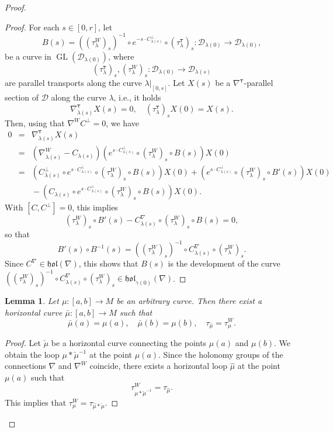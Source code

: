 \documentclass{amsart}
\theoremstyle{plain}
\newtheorem{lem}[theorem]{Lemma}
\theoremstyle{definition}
\newcommand{\GL}{\operatorname{GL}}
\newcommand{\hol}{\mathfrak{hol}}
\newcommand{\bt}{{\boldsymbol{\tau}}}
\newcommand{\1}{\mathbf{1}}
\newcommand{\D}{{\mathcal D}}
\newcommand{\+}{\oplus}
\begin{document}
\begin{proof}
\begin{proof}  For each $s\in [0,r]$, let 
$$B(s)=((\tau_\lambda^W)_s)^{-1}\circ e^{-s\cdot C^\bot_{\lambda(s)}}\circ (\tau_\lambda^\bt)_s:\D_{\lambda(0)}\to \D_{\lambda(0)},$$
be a curve in $\GL(\D_{\lambda(0)})$,
where $$(\tau_\lambda^\bt)_s,(\tau_\lambda^W)_s:\D_{\lambda(0)}\to\D_{\lambda(s)}$$ are parallel transports along the curve $\lambda|_{[0,s]}$.
Let $X(s)$ be a $\nabla^\bt$-parallel section of $\D$ along the curve $\lambda$, i.e., it holds
$$\nabla^\bt_{\dot\lambda(s)}X(s)=0,\quad (\tau_\lambda^\bt)_s X(0)=X(s). $$
Then, using that   $\nabla^W C^\perp=0$, we have 
\begin{eqnarray*}
0&=&\nabla_{\dot\lambda(s)}^\bt X(s)
\\
&=&\left(\nabla^W_{\dot\lambda(s)}-C_{\lambda(s)} \right) \left( e^{s\cdot C^\bot_{\lambda(s)}}\circ (\tau_\lambda^W)_s\circ B(s)\right) X(0)
\\
&=& \left(C^\bot_{\lambda(s)}\circ e^{s\cdot C^\bot_{\lambda(s)}}\circ (\tau_\lambda^W)_s\circ B(s)\right) X(0)+\left( e^{s\cdot C^\bot_{\lambda(s)}}\circ (\tau_\lambda^W)_s\circ B'(s)\right) X(0)
\\
&&{}-\left(C_{\lambda(s)}\circ e^{s\cdot C^\bot_{\lambda(s)}}\circ (\tau_\lambda^W)_s\circ B(s)\right) X(0).
\end{eqnarray*}
With  $[C,C^\perp]=0$, this implies 
$$(\tau_\lambda^W)_s\circ B'(s)-C^\nabla_{\lambda(s)}\circ (\tau_\lambda^W)_s\circ B(s)=0,$$
so that
$$ B'(s)\circ B^{-1}(s)=((\tau_\lambda^W)_s)^{-1}\circ C^\nabla_{\lambda(s)}\circ (\tau_\lambda^W)_s.$$ 
Since $C^\nabla\in \hol(\nabla)$, this  shows that $B(s)$ is the development of the curve 
$((\tau_\lambda^W)_s)^{-1}\circ C^\nabla_{\lambda(s)}\circ (\tau_\lambda^W)_s\in\hol_{\gamma(0)}(\nabla)$. \end{proof}

\begin{lem}\label{lemxi2} Let $\mu:[a,b]\to M$ be an arbitrary curve. Then there exist a horizontal curve $\bar\mu:[a,b]\to M$ such that
	$$\bar\mu(a)=\mu(a),\quad \bar\mu(b)=\mu(b),\quad \tau_{\bar\mu}=\tau^W_\mu.$$ 
\end{lem}

\begin{proof}  Let $\check\mu$ be a horizontal curve connecting the points $\mu(a)$ and $\mu(b)$. We obtain the loop $\mu*\check\mu^{-1}$ at the point $\mu(a)$.
Since the holonomy groups of the connections $\nabla$ and $\nabla^W$ coincide, there exists a horizontal loop $\hat\mu$ at the point $\mu(a)$ such that
$$\tau^W_{\mu*\check\mu^{-1}}=\tau_{\hat\mu}.$$ This implies that 
$\tau^W_{\mu}=\tau_{\hat\mu*\check\mu}$.
\end{proof}



\end{proof}
\end{document}
